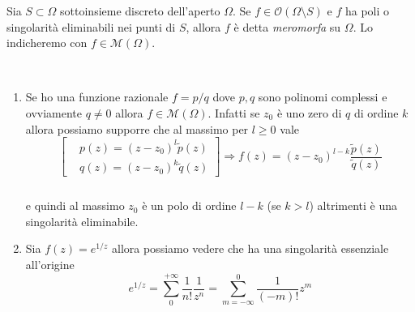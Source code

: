 \begin{definition}
  Sia $S \subset \Omega$ sottoinsieme discreto dell'aperto $\Omega$. Se $f \in
  \mathcal{O}(\Omega \setminus S)$ e $f$ ha poli o singolarità eliminabili nei
  punti di $S$, allora $f$ è detta \emph{meromorfa} su $\Omega$. Lo indicheremo
  con $f \in \mathcal{M}(\Omega)$.
  \label{def:meromorfismo}
\end{definition}

\begin{example}\
  \begin{enumerate}
    \item Se ho una funzione razionale $f= p / q$ dove $p,q$ sono polinomi complessi
      e ovviamente $q \neq 0$ allora $f \in \mathcal{M}(\Omega)$. Infatti se
      $z_0$ è uno zero di $q$ di ordine $k$ allora possiamo supporre che al
      massimo per $l \ge 0$ vale 
      \begin{equation*}
      \begin{bmatrix}
      &p(z) = (z-z_0)^l \tilde{p}(z) \\   &q(z)  = (z-z_0)^k \tilde{q}(z)
      \end{bmatrix} 
      \Longrightarrow f(z)  = (z-z_0)^{l-k}
      \frac{\tilde{p}(z)}{\tilde{q}(z)} 
      \end{equation*}

      \begin{align*}
        &   \\
        & & 
      \end{align*}
      e quindi al massimo $z_0$ è un polo di ordine $l-k$ (se $k > l$)
      altrimenti è una singolarità eliminabile. 
    \item Sia $f(z) = e^{1/z}$ allora possiamo vedere che ha una singolarità
      essenziale all'origine
      \begin{equation*}
        e^{1/z} = \sum_{0}^{+\infty} \frac{1}{n!}\frac{1}{z^n} = \sum_{m
        = -\infty}^{0} \frac{1}{(-m)!} z^m 
      \end{equation*}
  \end{enumerate}
\end{example}

